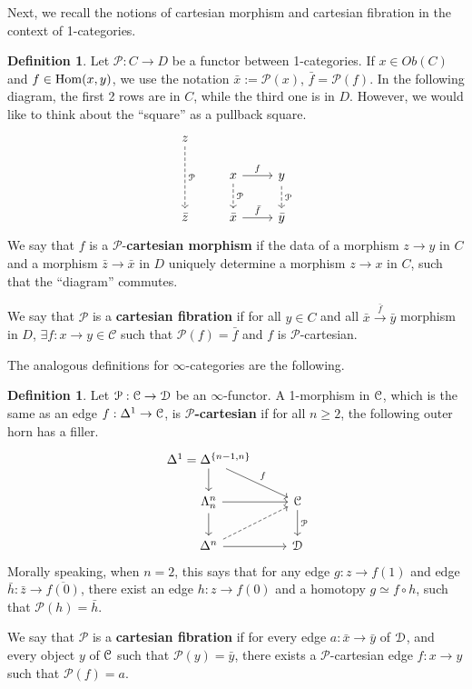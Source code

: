 \documentclass[10pt,a4paper,reqno,oneside]{book} %
\theoremstyle{plain}
\theoremstyle{definition}
\newtheorem{defin}[thm]{Definition}
\theoremstyle{remark}
\numberwithin{equation}{section}
\begin{document}
Next, we recall the notions of cartesian morphism and cartesian fibration in the context of 1-categories.
\begin{defin}
Let $\mathcal{P} : C \to D$ be a functor between 1-categories. If $x \in Ob(C)$ and $f\in \operatorname{Hom}(x,y)$, we use the notation
$\bar x := \mathcal{P}(x)$, $\bar f = \mathcal{P}(f)$. In the following diagram, the first 2 rows are in $C$, while the
third one is in $D$. However, we would like to think about the ``square'' as a pullback square.
\[
\begin{tikzcd}
z\arrow[dashed]{dd}{\mathcal{P}} & & \\
& x\arrow{r}{f}\arrow[dashed]{d}{\mathcal{P}} & y\arrow[dashed]{d}{\mathcal{P}} \\
\bar z & \bar x \arrow{r}{\bar f} & \bar y
\end{tikzcd}
\]
We say that $f$ is a $\mathcal{P}$-\textbf{cartesian morphism} if the data of a morphism $z \to y$ in $C$ and a 
morphism $\bar z \to \bar x$
in $D$ uniquely determine a morphism $z \to x$ in $C$, such that the ``diagram'' commutes.

We say that $\mathcal{P}$ is a \textbf{cartesian fibration} if for all $y \in C$ and all $\bar x \overset{\bar f}{\to} \bar y$ 
morphism in $D$, $\exists f : x \to y \in \mathcal{C}$ such that $\mathcal{P}(f) = \bar f$ and $f$ is $\mathcal{P}$-cartesian.
\end{defin}

The analogous definitions for $\infty$-categories are the following.

\begin{defin}
Let $\mathcal{P} : \mathcal C \to \mathcal D$ be an $\infty$-functor. A 1-morphism in $\mathcal C$, which is the same as an edge $f: \Delta^1
\to \mathcal C$, is $\mathcal{P}$\textbf{-cartesian} if for all $n\geq 2$, the following outer horn has a filler.
\[
\begin{tikzcd}
\Delta^1 = \Delta^{\{n-1,n\}}\arrow{d}\arrow{dr}{f} & \\
\Lambda^n_n\arrow{d}\arrow{r} & \cC \arrow{d}{\mathcal{P}} \\
\Delta^n \arrow{r}\arrow[dashed]{ur} & \cD
\end{tikzcd}
\]
Morally speaking, when $n=2$, this says that for any edge $g: z \to f(1)$ and edge $\bar h : \bar z \to \overline{f(0)}$,
there exist an edge $h : z \to f(0)$ and a homotopy $g \simeq f \circ h$, such that $\mathcal{P}(h) = \bar h$.

We say that $\mathcal{P}$ is a \textbf{cartesian fibration} if for every edge $a : \bar x \to \bar y$ of $\mathcal D$, and every
object $y$ of $\mathcal C$ such that $\mathcal{P}(y) = \bar y$, there exists a $\mathcal{P}$-cartesian edge $f : x \to y$ such that
$\mathcal{P}(f) = a$.
\end{defin}
\end{document}
